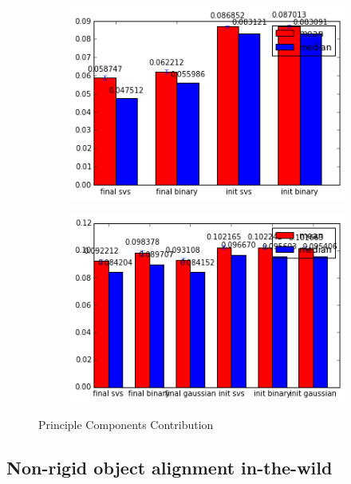 \begin{figure}[h!]
\begin{subfigure}[b]{0.2\textwidth}
            \includegraphics[width=\textwidth]{resources/Fig_SVS/faces_svs_binary_gaussian_statistics}
    \end{subfigure}
    \hfill
    \begin{subfigure}[b]{0.2\textwidth}
            \includegraphics[width=\textwidth]{resources/Fig_SVS/ears_svs_binary_gaussian_statistics}
    \end{subfigure}
    \caption{Principle Components Contribution}
\end{figure}



\subsection{Non-rigid object alignment in-the-wild}
\label{exp:1}

